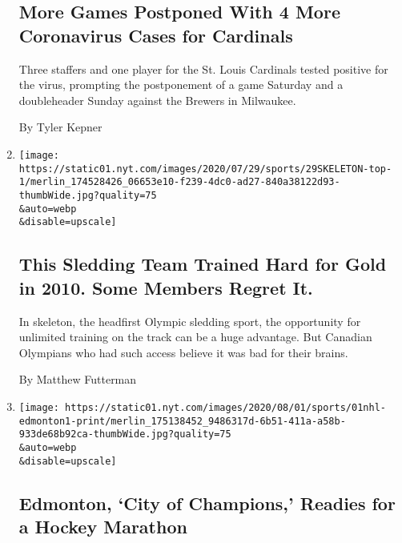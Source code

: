 \begin{enumerate}
  \hypertarget{more-games-postponed-with-4-more-coronavirus-cases-for-cardinals}{%
  \subsection{More Games Postponed With 4 More Coronavirus Cases for
  Cardinals}\label{more-games-postponed-with-4-more-coronavirus-cases-for-cardinals}}

  Three staffers and one player for the St. Louis Cardinals tested
  positive for the virus, prompting the postponement of a game Saturday
  and a doubleheader Sunday against the Brewers in Milwaukee.

  By Tyler Kepner
\item
  \href{/2020/08/01/sports/olympics/concussion-skeleton-sledding-brain-damage.html}{}

  \texttt{[image: https://static01.nyt.com/images/2020/07/29/sports/29SKELETON-top-1/merlin\_174528426\_06653e10-f239-4dc0-ad27-840a38122d93-thumbWide.jpg?quality=75\\\&auto=webp\\\&disable=upscale]}

  \hypertarget{this-sledding-team-trained-hard-for-gold-in-2010-some-members-regret-it}{%
  \subsection{This Sledding Team Trained Hard for Gold in 2010. Some
  Members Regret
  It.}\label{this-sledding-team-trained-hard-for-gold-in-2010-some-members-regret-it}}

  In skeleton, the headfirst Olympic sledding sport, the opportunity for
  unlimited training on the track can be a huge advantage. But Canadian
  Olympians who had such access believe it was bad for their brains.

  By Matthew Futterman
\item
  \href{/2020/08/01/sports/hockey/edmonton-nhl-playoffs.html}{}

  \texttt{[image: https://static01.nyt.com/images/2020/08/01/sports/01nhl-edmonton1-print/merlin\_175138452\_9486317d-6b51-411a-a58b-933de68b92ca-thumbWide.jpg?quality=75\\\&auto=webp\\\&disable=upscale]}

  \hypertarget{edmonton-city-of-champions-readies-for-a-hockey-marathon}{%
  \subsection{Edmonton, `City of Champions,' Readies for a Hockey
  Marathon}\label{edmonton-city-of-champions-readies-for-a-hockey-marathon}}


\end{enumerate}
